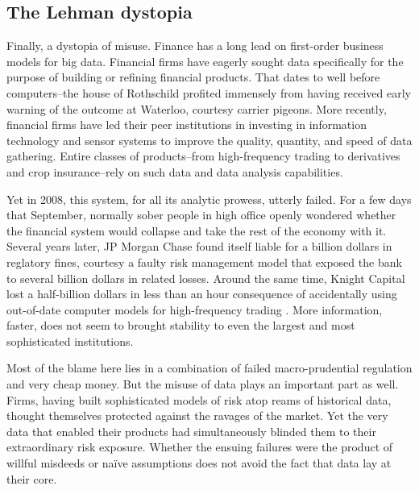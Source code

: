 \documentclass[12pt]{article}
\begin{document}

\subsection{The Lehman dystopia}
\label{sec:lehman-dystopia}

Finally, a dystopia of misuse. Finance has a long lead on first-order
business models for big data. Financial firms have eagerly sought data
specifically for the purpose of building or refining financial
products. That dates to well before computers--the house of Rothschild
profited immensely from having received early warning of the outcome
at Waterloo, courtesy carrier pigeons. More recently, financial firms
have led their peer institutions in investing in information
technology and sensor systems to improve the quality, quantity, and
speed of data gathering. Entire classes of products--from
high-frequency trading to derivatives and crop insurance--rely on such
data and data analysis capabilities.

Yet in 2008, this system, for all its analytic prowess, utterly
failed. For a few days that September, normally sober people in
high office openly wondered whether the financial system would
collapse and take the rest of the economy with it. Several years
later, JP Morgan Chase found itself liable for a billion dollars in
reglatory fines, courtesy a faulty risk management model that exposed
the bank to several billion dollars in related losses.\citep{kopecki2013} Around the same time,
Knight Capital lost a half-billion dollars in less than an hour
consequence of accidentally using out-of-date computer models for
high-frequency trading \citep{strasburg2012}. More information, faster, does not seem to
brought stability to even the largest and most sophisticated institutions.

Most of the blame here lies in a combination of failed
macro-prudential regulation and very cheap money. But the misuse of
data plays an important part as well. Firms, having built
sophisticated models of risk atop reams of historical data, thought
themselves protected against the ravages of the market. Yet the very
data that enabled their products had simultaneously blinded them to
their extraordinary risk exposure. Whether the ensuing failures were the
product of willful misdeeds or na\"ive assumptions does not avoid the
fact that data lay at their core.
\end{document}
